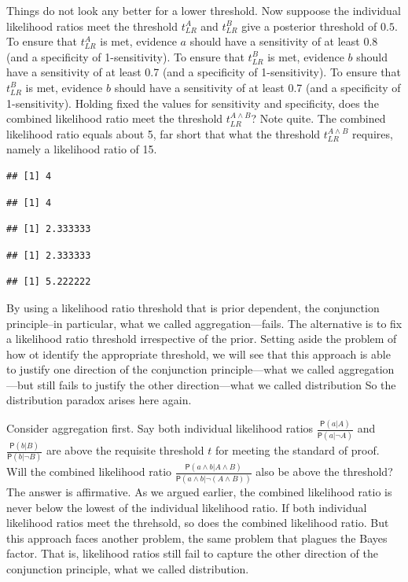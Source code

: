 \documentclass[10pt,dvipsnames,enabledeprecatedfontcommands]{scrartcl}
\newcommand{\et}{\wedge}
\newcommand{\pr}[1]{\mathsf{P}(#1)}
\begin{document}
Things do not look any better for a lower threshold. Now suppoose the
individual likelihood ratios meet the threshold \(t_{LR}^{A}\) and
\(t_{LR}^{B}\) give a posterior threshold of \(0.5\). To ensure that
\(t_{LR}^{A}\) is met, evidence \(a\) should have a sensitivity of at
least 0.8 (and a specificity of 1-sensitivity). To ensure that
\(t_{LR}^{B}\) is met, evidence \(b\) should have a sensitivity of at
least 0.7 (and a specificity of 1-sensitivity). To ensure that
\(t_{LR}^{B}\) is met, evidence \(b\) should have a sensitivity of at
least 0.7 (and a specificity of 1-sensitivity). Holding fixed the values
for sensitivity and specificity, does the combined likelihood ratio meet
the threshold \(t_{LR}^{A\wedge B}\)? Note quite. The combined
likelihood ratio equals about 5, far short that what the threshold
\(t^{A\wedge B}_{LR}\) requires, namely a likelihood ratio of 15.

\begin{verbatim}
## [1] 4
\end{verbatim}

\begin{verbatim}
## [1] 4
\end{verbatim}

\begin{verbatim}
## [1] 2.333333
\end{verbatim}

\begin{verbatim}
## [1] 2.333333
\end{verbatim}

\begin{verbatim}
## [1] 5.222222
\end{verbatim}

By using a likelihood ratio threshold that is prior dependent, the
conjunction principle--in particular, what we called
aggregation---fails. The alternative is to fix a likelihood ratio
threshold irrespective of the prior. Setting aside the problem of how ot
identify the appropriate threshold, we will see that this approach is
able to justify one direction of the conjunction principle---what we
called aggregation---but still fails to justify the other
direction---what we called distribution So the distribution paradox
arises here again.

Consider aggregation first. Say both individual likelihood ratios
\(\frac{\pr{a |A}}{\pr{a | \neg A}}\) and
\(\frac{\pr{b |B}}{\pr{b | \neg B}}\) are above the requisite threshold
\(t\) for meeting the standard of proof. Will the combined likelihood
ratio \(\frac{\pr{ a \et b |A \et B}}{\pr{a \et b | \neg (A \et B)}}\)
also be above the threshold? The answer is affirmative. As we argued
earlier, the combined likelihood ratio is never below the lowest of the
individual likelihood ratio. If both individual likelihood ratios meet
the threhsold, so does the combined likelihood ratio. But this approach
faces another problem, the same problem that plagues the Bayes factor.
That is, likelihood ratios still fail to capture the other direction of
the conjunction principle, what we called distribution.
\end{document}
